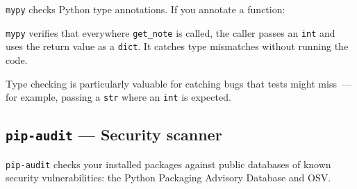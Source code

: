 \texttt{mypy} checks Python type annotations. If you annotate a function:

\begin{codebox}[short]

\begin{Shaded}
\begin{Highlighting}[]
\NormalTok{) }\OperatorTok{{-}\textgreater{}} \NormalTok{:}
\end{Highlighting}
\end{Shaded}

\end{codebox}

\noindent{}\texttt{mypy} verifies that everywhere \texttt{get\_note} is called, the caller passes an \texttt{int} and uses the return value as a \texttt{dict}. It catches type mismatches without running the code.

\begin{codebox}[short]

\begin{Shaded}
\begin{Highlighting}[]
\end{Highlighting}
\end{Shaded}

\end{codebox}

\noindent{}Type checking is particularly valuable for catching bugs that tests might miss~--- for example, passing a \texttt{str} where an \texttt{int} is expected.

\subsection*{\texorpdfstring{\texttt{pip-audit} --- Security scanner}{pip-audit --- Security scanner}}\label{17-build-process:pip-audit--security-scanner}

\texttt{pip-audit} checks your installed packages against public databases of known security vulnerabilities: the Python Packaging Advisory Database and OSV.

\begin{codebox}[short]

\begin{Shaded}
\begin{Highlighting}[]
\end{Highlighting}
\end{Shaded}

\end{codebox}

